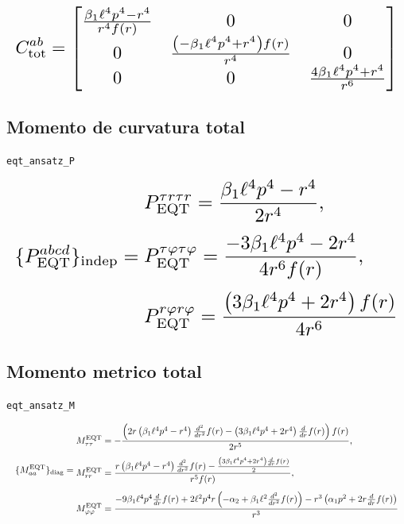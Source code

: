 \documentclass[11pt,a4paper]{article}
\begin{document}
\[
\resizebox{\textwidth}{!}{$\displaystyle C^{ab}_{\mathrm{tot}} = \left[\begin{matrix}\frac{\beta_{1} \ell^{4} p^{4} - r^{4}}{r^{4} f{\left(r \right)}} & 0 & 0\\0 & \frac{\left(- \beta_{1} \ell^{4} p^{4} + r^{4}\right) f{\left(r \right)}}{r^{4}} & 0\\0 & 0 & \frac{4 \beta_{1} \ell^{4} p^{4} + r^{4}}{r^{6}}\end{matrix}\right]$}
\]

\subsection{Momento de curvatura total}

\noindent\texttt{eqt\_ansatz\_P}\par\nopagebreak[4]

\[
\resizebox{\textwidth}{!}{$\displaystyle \{P^{abcd}_{\mathrm{EQT}}\}_{\mathrm{indep}} = \begin{aligned}&P_{\mathrm{EQT}}^{{\tau}{r}{\tau}{r}}=\frac{\beta_{1} \ell^{4} p^{4} - r^{4}}{2 r^{4}},\\[2pt]&P_{\mathrm{EQT}}^{{\tau}{\varphi}{\tau}{\varphi}}=\frac{- 3 \beta_{1} \ell^{4} p^{4} - 2 r^{4}}{4 r^{6} f{\left(r \right)}},\\[2pt]&P_{\mathrm{EQT}}^{{r}{\varphi}{r}{\varphi}}=\frac{\left(3 \beta_{1} \ell^{4} p^{4} + 2 r^{4}\right) f{\left(r \right)}}{4 r^{6}}\end{aligned}$}
\]

\subsection{Momento metrico total}

\noindent\texttt{eqt\_ansatz\_M}\par\nopagebreak[4]

\[
\resizebox{\textwidth}{!}{$\displaystyle \{M^{\mathrm{EQT}}_{aa}\}_{\mathrm{diag}} = \begin{aligned}&M^{\mathrm{EQT}}_{\tau\tau}=- \frac{\left(2 r \left(\beta_{1} \ell^{4} p^{4} - r^{4}\right) \frac{d^{2}}{d r^{2}} f{\left(r \right)} - \left(3 \beta_{1} \ell^{4} p^{4} + 2 r^{4}\right) \frac{d}{d r} f{\left(r \right)}\right) f{\left(r \right)}}{2 r^{5}},\\[4pt]&M^{\mathrm{EQT}}_{rr}=\frac{r \left(\beta_{1} \ell^{4} p^{4} - r^{4}\right) \frac{d^{2}}{d r^{2}} f{\left(r \right)} - \frac{\left(3 \beta_{1} \ell^{4} p^{4} + 2 r^{4}\right) \frac{d}{d r} f{\left(r \right)}}{2}}{r^{5} f{\left(r \right)}},\\[4pt]&M^{\mathrm{EQT}}_{\varphi\varphi}=\frac{- 9 \beta_{1} \ell^{4} p^{4} \frac{d}{d r} f{\left(r \right)} + 2 \ell^{2} p^{4} r \left(- \alpha_{2} + \beta_{1} \ell^{2} \frac{d^{2}}{d r^{2}} f{\left(r \right)}\right) - r^{3} \left(\alpha_{1} p^{2} + 2 r \frac{d}{d r} f{\left(r \right)}\right)}{r^{3}}\end{aligned}$}
\]
\end{document}
